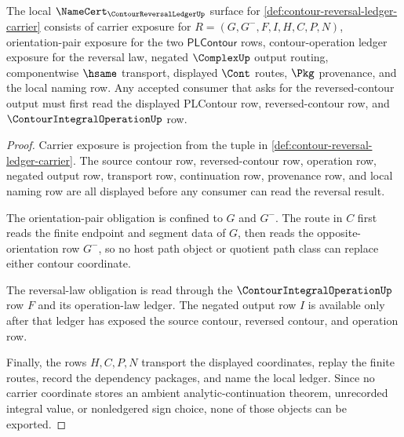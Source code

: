 \begin{theorem}
\label{thm:contour-reversal-ledger-namecert-obligations}
The local $\NameCert_{\ContourReversalLedgerUp}$ surface for \autoref{def:contour-reversal-ledger-carrier} consists of carrier exposure for $R=(G,G^{-},F,I,H,C,P,N)$, orientation-pair exposure for the two $\mathsf{PLContour}$ rows, contour-operation ledger exposure for the reversal law, negated $\ComplexUp$ output routing, componentwise $\hsame$ transport, displayed $\Cont$ routes, $\Pkg$ provenance, and the local naming row. Any accepted consumer that asks for the reversed-contour output must first read the displayed PLContour row, reversed-contour row, and $\ContourIntegralOperationUp$ row.
\end{theorem}
\begin{proof}
Carrier exposure is projection from the tuple in \autoref{def:contour-reversal-ledger-carrier}. The source contour row, reversed-contour row, operation row, negated output row, transport row, continuation row, provenance row, and local naming row are all displayed before any consumer can read the reversal result.

The orientation-pair obligation is confined to $G$ and $G^{-}$. The route in $C$ first reads the finite endpoint and segment data of $G$, then reads the opposite-orientation row $G^{-}$, so no host path object or quotient path class can replace either contour coordinate.

The reversal-law obligation is read through the $\ContourIntegralOperationUp$ row $F$ and its operation-law ledger. The negated output row $I$ is available only after that ledger has exposed the source contour, reversed contour, and operation row.

Finally, the rows $H,C,P,N$ transport the displayed coordinates, replay the finite routes, record the dependency packages, and name the local ledger. Since no carrier coordinate stores an ambient analytic-continuation theorem, unrecorded integral value, or nonledgered sign choice, none of those objects can be exported.
\end{proof}

